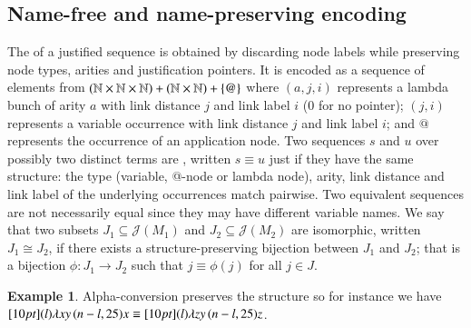 \documentclass{elsarticle}
\theoremstyle{plain}
\theoremstyle{definition}
\newtheorem{example}{Example}[section]
\def\structisomorphic{\cong} %
\def\justseqset{\mathcal{J}}
\begin{document}
\subsection{Name-free and name-preserving encoding}
The  of a justified sequence is obtained by discarding node labels while preserving node types, arities and justification pointers. It is encoded as a sequence of elements from
$(\mathbb{N}\times\mathbb{N}\times\mathbb{N}) +
   (\mathbb{N}\times\mathbb{N})
   + \{ @ \}$
where $(a, j, i)$ represents a lambda bunch of arity $a$
with link distance $j$ and link label $i$ ($0$ for no pointer);
$(j, i)$ represents a variable occurrence
with link distance $j$ and link label $i$;
and $@$ represents the occurrence of an application node.
%
Two sequences $s$ and $u$ over possibly two distinct terms are , written $s \equiv u$ just if they have the same structure: the type (variable, @-node or lambda node), arity, link distance and link label of the underlying occurrences match pairwise. Two equivalent sequences are not necessarily equal since they may have different variable names.
We say that two subsets $J_1\subseteq \justseqset(M_1)$ and $J_2\subseteq\justseqset(M_2)$ are isomorphic, written $J_1\structisomorphic J_2$, if  there exists a structure-preserving bijection between $J_1$ and $J_2$; that is a bijection $\phi :J_1\longrightarrow J_2$ such that $j\equiv\phi(j)$ for all $j\in J$.

\begin{example}
    Alpha-conversion preserves the structure so for instance we have
    $\Pstr[10pt]{ (l){\lambda x y} \, (n-l,25){x} } \equiv \Pstr[10pt]{ (l){\lambda z y} \, (n-l,25){z}}$.
\end{example}
\end{document}
